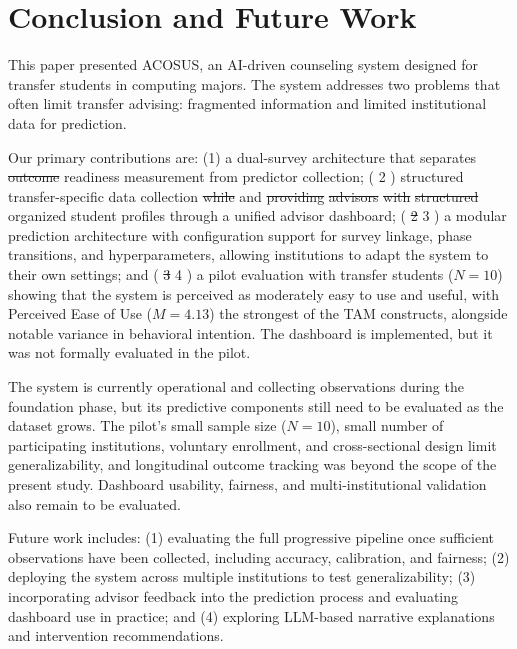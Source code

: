 \documentclass[letterpaper,11pt]{article}
\newcommand{\DIFdel}[1]{%
  \begingroup\setlength{\fboxsep}{0.5pt}%
  \colorbox{diffdelbg}{\textcolor{diffdeltext}{\sout{#1}}}%
  \endgroup}
\newcommand{\DIFadd}[1]{%
  \begingroup\setlength{\fboxsep}{0.5pt}%
  \colorbox{diffaddbg}{\textcolor{diffaddtext}{#1}}%
  \endgroup}
\begin{document}
\section{Conclusion and Future Work}\label{sec:conclusion}

This paper presented ACOSUS, an AI-driven counseling system designed for transfer students in computing majors. The system addresses two problems that often limit transfer advising: fragmented information and limited institutional data for prediction.

Our primary contributions are: (1) a dual-survey architecture that separates \DIFdel{outcome} \DIFadd{readiness} measurement from predictor \DIFadd{collection;} (\DIFadd{2}) \DIFadd{structured} \DIFadd{transfer-specific} \DIFadd{data} collection \DIFdel{while} \DIFadd{and} \DIFdel{providing} \DIFdel{advisors} \DIFdel{with} \DIFdel{structured} \DIFadd{organized} student profiles through a unified \DIFadd{advisor} dashboard; (\DIFdel{2} \DIFadd{3}) a modular prediction architecture with configuration support for survey linkage, phase transitions, and hyperparameters, allowing institutions to adapt the system to their own settings; and (\DIFdel{3} \DIFadd{4}) a pilot evaluation with transfer students ($N=10$) showing that the system is perceived as moderately easy to use and useful, with Perceived Ease of Use ($M=4.13$) the strongest of the TAM constructs, alongside notable variance in behavioral intention. \DIFadd{The} \DIFadd{dashboard} \DIFadd{is} \DIFadd{implemented,} \DIFadd{but} \DIFadd{it} \DIFadd{was} \DIFadd{not} \DIFadd{formally} \DIFadd{evaluated} \DIFadd{in} \DIFadd{the} \DIFadd{pilot.}

The system is currently operational and collecting observations during the foundation phase, but its predictive components still need to be evaluated as the dataset grows. The pilot's small sample size ($N=10$), small number of participating institutions, voluntary enrollment, and cross-sectional design limit generalizability, and longitudinal outcome tracking was beyond the scope of the present study. \DIFadd{Dashboard} \DIFadd{usability,} \DIFadd{fairness,} \DIFadd{and} \DIFadd{multi-institutional} \DIFadd{validation} \DIFadd{also} \DIFadd{remain} \DIFadd{to} \DIFadd{be} \DIFadd{evaluated.}

Future work includes: (1) evaluating the full progressive pipeline once sufficient observations have been collected, including accuracy, calibration, and fairness; (2) deploying the system across multiple institutions to test generalizability; (3) incorporating advisor feedback into the prediction process and evaluating dashboard use in practice; and (4) exploring LLM-based narrative explanations and intervention recommendations.
\end{document}
